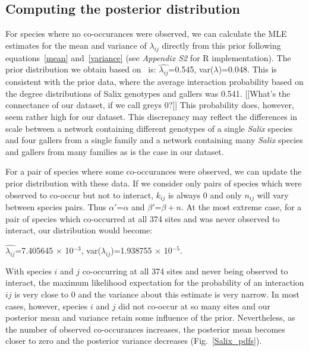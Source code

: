 \documentclass[12pt]{article}
\begin{document}
    \subsection*{Computing the posterior distribution}

      For species where no co-occurances were observed, we can 
      calculate the MLE estimates for the mean and variance of 
      $\lambda_{ij}$ directly from this prior following 
      equations~\ref{mean} and~\ref{variance} 
      (see \emph{Appendix S2} for R implementation). The prior 
      distribution we obtain based on~\citet{Barbour2016,Barbour2016Dryad} is:
      $\hat{\lambda_{ij}}$=0.545, var($\lambda$)=0.048.
      This is consistent with the prior data, where the average 
      interaction probability based on the degree distributions of Salix genotypes and gallers was 0.541. [[What's the connectance of our dataset, if we call greys 0?]] This probability does, however, seem rather high for our dataset. This discrepancy may reflect the differences in scale between a network containing different genotypes of a single \emph{Salix} species and four gallers from a single family and a network containing many \emph{Salix} species and gallers from many families as is the case in our dataset.


      For a pair of species where some co-occurances were observed, we can update the prior distribution with these data. If we consider only pairs of species which were observed to co-occur but not to interact, $k_{ij}$ is always 0 and only $n_{ij}$ will vary between species pairs. Thus $\alpha'$=$\alpha$ and $\beta'$=$\beta + n$. At the most extreme case, for a pair of species which co-occurred at all 374 sites and was never observed to interact, our distribution would become:


      $\hat{\lambda_{ij}}$=7.405645 $\times$ 10$^{-3}$, var($\lambda_{ij}$)=1.938755 $\times$ 10$^{-5}$.
      
      With species $i$ and $j$ co-occurring at all 374 sites and never being observed to interact, the maximum likelihood expectation for the probability of an interaction $ij$ is very close to 0 and the variance about this estimate is very narrow. In most cases, however, species $i$ and $j$ did not co-occur at so many sites and our posterior mean and variance retain some influence of the prior. Nevertheless, as the number of observed co-occurances increases, the posterior mean becomes closer to zero and the posterior variance decreases (Fig.~\ref{Salix_pdfs}).
\end{document}
